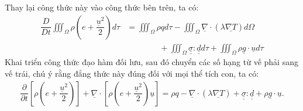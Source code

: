 \documentclass[../../../main.tex]{subfiles}
\begin{document}
    Thay lại công thức này vào công thức bên trên, ta có:
        \[
            \begin{aligned}
                \dfrac{D}{Dt}\iiint_{\Omega}\rho\left(e+\dfrac{\underline{u}^2}{2}\right)d\tau&=\iiint_{\Omega}\rho qd\tau-\iiint_{\Omega}\underline{\nabla}\cdot\left(\lambda\underline{\nabla T}\right)d\Omega\\
                &\qquad\qquad+\iiint_{\Omega}\underline{\underline{\sigma}}\colon\underline{\underline{d}}d\tau+\iiint_{\Omega}\rho\underline{g}\cdot\underline{u}d\tau
            \end{aligned}
        \]
    Khai triển công thức đạo hàm đối lưu, sau đó chuyển các số hạng từ vế phải sang vế trái, chú ý rằng đẳng thức này đúng đối với mọi thể tích con, ta có:
        \begin{align}
            \boxed{\dfrac{\partial}{\partial t}\left[\rho\left(e+\dfrac{\underline{u}^2}{2}\right)\right]+\underline{\nabla}\cdot\left[\rho\left(e+\dfrac{\underline{u}^2}{2}\right)\underline{u}\right]=\rho q-\underline{\nabla}\cdot\left(\lambda\underline{\nabla T}\right)+\underline{\underline{\sigma}}:\underline{\underline{d}}+\rho\underline{g}\cdot\underline{u}}.
        \end{align}

\end{document}
